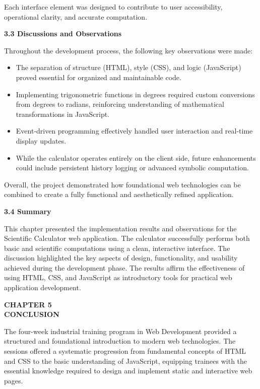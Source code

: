 \documentclass[a4paper,12pt,oneside]{report}
\numberwithin{equation}{chapter}
\numberwithin{figure}{chapter}
\numberwithin{table}{chapter}
\begin{document}
Each interface element was designed to contribute to user accessibility, operational clarity, and accurate computation.

\bigskip
\noindent
\textbf{3.3 Discussions and Observations}

Throughout the development process, the following key observations were made:
\begin{itemize}
    \item The separation of structure (HTML), style (CSS), and logic (JavaScript) proved essential for organized and maintainable code.
    \item Implementing trigonometric functions in degrees required custom conversions from degrees to radians, reinforcing understanding of mathematical transformations in JavaScript.
    \item Event-driven programming effectively handled user interaction and real-time display updates.
    \item While the calculator operates entirely on the client side, future enhancements could include persistent history logging or advanced symbolic computation.
\end{itemize}

Overall, the project demonstrated how foundational web technologies can be combined to create a fully functional and aesthetically refined application.

\bigskip
\noindent
\textbf{3.4 Summary}

This chapter presented the implementation results and observations for the Scientific Calculator web application. The calculator successfully performs both basic and scientific computations using a clean, interactive interface. The discussion highlighted the key aspects of design, functionality, and usability achieved during the development phase. The results affirm the effectiveness of using HTML, CSS, and JavaScript as introductory tools for practical web application development.


\newpage
\begin{center}
    \Large\textbf{CHAPTER 5}\\[0.3cm]
    \large\textbf{CONCLUSION}
\end{center}

The four-week industrial training program in Web Development provided a structured and foundational introduction to modern web technologies. The sessions offered a systematic progression from fundamental concepts of HTML and CSS to the basic understanding of JavaScript, equipping trainees with the essential knowledge required to design and implement static and interactive web pages. 
\end{document}
